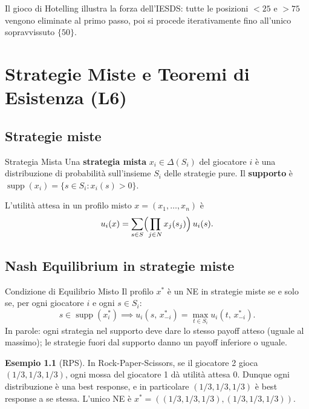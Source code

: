 \documentclass[12pt,a4paper,twoside]{book}
\theoremstyle{plain}
\theoremstyle{definition}
\newtheorem{example}[theorem]{Esempio}
\DeclareMathOperator{\supp}{supp}
\begin{document}
Il gioco di Hotelling illustra la forza dell'IESDS: tutte le posizioni $<25$ e $>75$ vengono eliminate al primo passo, poi si procede iterativamente fino all'unico sopravvissuto $\{50\}$.

\chapter{Strategie Miste e Teoremi di Esistenza (L6)}
\label{ch:mixed}

\section{Strategie miste}

\begin{defbox}{Strategia Mista}
Una \textbf{strategia mista} $x_i\in\Delta(S_i)$ del giocatore $i$ è una distribuzione di probabilità sull'insieme $S_i$ delle strategie pure. Il \textbf{supporto} è $\supp(x_i)=\{s\in S_i : x_i(s)>0\}$.
\end{defbox}

L'utilità attesa in un profilo misto $x=(x_1,\dots,x_n)$ è
\[
  u_i(x) = \sum_{s\in S} \Bigl(\prod_{j\in N} x_j(s_j)\Bigr)\, u_i(s).
\]

\section{Nash Equilibrium in strategie miste}

\begin{thmbox}{Condizione di Equilibrio Misto}
Il profilo $x^*$ è un NE in strategie miste se e solo se, per ogni giocatore $i$ e ogni $s\in S_i$:
\[
  s\in\supp(x^*_i) \implies u_i(s,\,x^*_{-i}) = \max_{t\in S_i} u_i(t,\,x^*_{-i}).
\]
In parole: ogni strategia nel supporto deve dare lo stesso payoff atteso (uguale al massimo); le strategie fuori dal supporto danno un payoff inferiore o uguale.
\end{thmbox}

\begin{example}[RPS]
In Rock-Paper-Scissors, se il giocatore 2 gioca $(1/3,1/3,1/3)$, ogni mossa del giocatore 1 dà utilità attesa $0$. Dunque ogni distribuzione è una best response, e in particolare $(1/3,1/3,1/3)$ è best response a se stessa. L'unico NE è $x^*=((1/3,1/3,1/3),(1/3,1/3,1/3))$.
\end{example}
\end{document}
